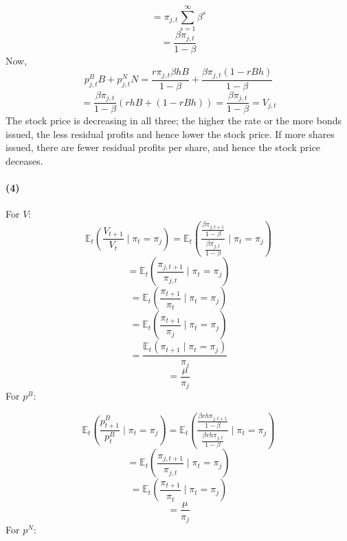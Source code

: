 \documentclass[10pt,letter]{article}
\newcommand{\problempart}[1]{\paragraph{#1}}
\begin{document}
\[  = \pi_{j,t} \sum_{s=1}^\infty \beta^s\]
\[ = \frac{\beta\pi_{j,t}}{1-\beta} \]
Now,
\[ p^B_{j,t} B + p^N_{j,t} N = \frac{r \pi_{j,t} \beta h B}{1-\beta} + \frac{\beta \pi_{j,t}\left(1 - rBh \right)}{1-\beta} \]
\[= \frac{\beta \pi_{j, t} }{1-\beta}(rhB + (1-rBh)) = \frac{\beta \pi_{j, t} }{1-\beta} = V_{j,t} \]
The stock price is decreasing in all three; the higher the rate or the more bonds issued, the less residual profits and hence lower the stock price. If more shares issued, there are fewer residual profits per share, and hence the stock price deceases.

\problempart{(4)}
For $V$:
\[ \mathbb{E}_t \left( \frac{V_{t+1}}{V_t} \mid \pi_t = \pi_j \right) = \mathbb{E}_t \left( \frac{\frac{\beta\pi_{j,t+1}}{1-\beta}}{\frac{\beta\pi_{j,t}}{1-\beta}} \mid \pi_t = \pi_j \right)  \]
\[ =  \mathbb{E}_t \left( \frac{\pi_{j,t+1}}{\pi_{j,t}} \mid \pi_t = \pi_j \right) \]
\[ =  \mathbb{E}_t \left( \frac{\pi_{t+1}}{\pi_{t}} \mid \pi_t = \pi_j \right) \]
\[ =  \mathbb{E}_t \left( \frac{\pi_{t+1}}{\pi_j} \mid \pi_t = \pi_j \right) \]
\[ =  \frac{\mathbb{E}_t \left( \pi_{t+1} \mid \pi_t = \pi_j \right)}{\pi_j} \]
\[ =  \frac{\mu}{\pi_j} \]
For $p^B$:

\[ \mathbb{E}_t \left( \frac{p^B_{t+1}}{p^B_t} \mid \pi_t = \pi_j \right) = \mathbb{E}_t \left( \frac{\frac{\beta r h \pi_{j,t+1}}{1-\beta}}{\frac{\beta r h \pi_{j,t}}{1-\beta}} \mid \pi_t = \pi_j \right)  \]
\[ =  \mathbb{E}_t \left( \frac{\pi_{j,t+1}}{\pi_{j,t}} \mid \pi_t = \pi_j \right) \]
\[ =  \mathbb{E}_t \left( \frac{\pi_{t+1}}{\pi_{t}} \mid \pi_t = \pi_j \right) \]
\[ =  \frac{\mu}{\pi_j} \]
For $p^N$:
\end{document}

